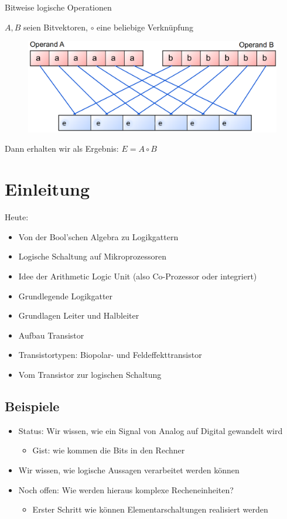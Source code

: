 \documentclass[12pt%
,aspectratio=169%
]{beamer}
\begin{document}
\begin{frame}{Bitweise logische Operationen}
\begin{center}
$A,B$ seien Bitvektoren, $\circ$ eine beliebige Verknüpfung
\begin{figure}
\includegraphics[scale=0.3]{pictures/bitvec}
\end{figure}
Dann erhalten wir als Ergebnis: $E = A \circ B$
\end{center}
\end{frame}

\section{Einleitung}
\begin{frame}{Heute:}
\begin{itemize}
	\item Von der Bool'schen Algebra zu Logikgattern
	\item Logische Schaltung auf Mikroprozessoren
	\item Idee der Arithmetic Logic Unit (also Co-Prozessor oder integriert)
	\item Grundlegende Logikgatter
	\item Grundlagen Leiter und Halbleiter
	\item Aufbau Transistor
	\item Transistortypen: Biopolar- und Feldeffekttransistor
	\item Vom Transistor zur logischen Schaltung
\end{itemize}
\end{frame}
\subsection{Beispiele}
\begin{frame}
	\begin{itemize}
		\item Status: Wir wissen, wie ein Signal von Analog auf Digital gewandelt wird
		\begin{itemize}
			\item Gist: wie kommen die Bits in den Rechner
		\end{itemize}
		\item Wir wissen, wie logische Aussagen verarbeitet werden können
		\item Noch offen: Wie werden hieraus komplexe Recheneinheiten?
		\begin{itemize}
			\item Erster Schritt wie können Elementarschaltungen realisiert werden
		\end{itemize}
	\end{itemize}
\end{frame}
\end{document}
